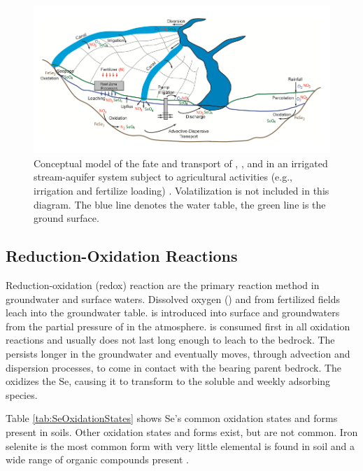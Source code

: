 \begin{figure}[!htbp]
	\centering
	\includegraphics[scale=1]{"Figures/fateAndTransport"}
	\caption[Conceptual model of the fate and transport of O2, NO3, and SeO4 in an irrigated stream-aquifer system subject to agricultural activities.]{Conceptual model of the fate and transport of \dox, \nitrate, and \sulfate in an irrigated stream-aquifer system subject to agricultural activities (e.g., irrigation and fertilize loading) \parencite{Bailey2012}.  Volatilization is not included in this diagram.  The blue line denotes the water table, the green line is the ground surface.}
	\label{fig:fateAndTransport}
\end{figure}

\subsection*{Reduction-Oxidation Reactions}
Reduction-oxidation (redox) reaction are the primary reaction method in groundwater and surface waters.  Dissolved oxygen (\dox) and \nitrate from fertilized fields leach into the groundwater table.   \dox is introduced into surface and groundwaters from the partial pressure of \dox in the atmosphere.  \dox is consumed first in all oxidation reactions and usually does not last long enough to leach to the bedrock.  The \nitrate persists longer in the groundwater and eventually moves, through advection and dispersion processes, to come in contact with the \Se bearing parent bedrock.  The \nitrate oxidizes the Se, causing it to transform to the soluble and weekly adsorbing \selenate species.

Table \ref{tab:SeOxidationStates} shows Se's common oxidation states and forms present in soils.  Other oxidation states and forms exist, but are not common.  Iron selenite is the most common form with very little elemental \Se is found in soil and a wide range of organic \Se compounds present \parencite{Painter1940}.

